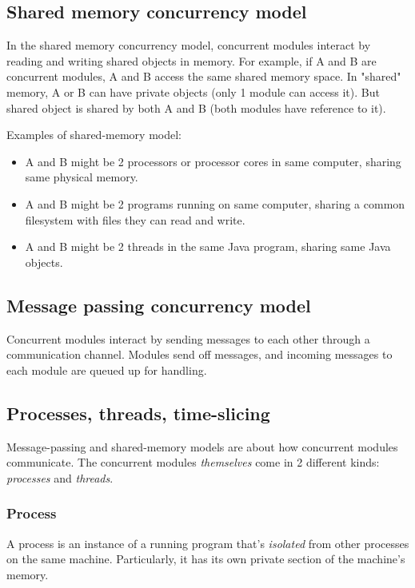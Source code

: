 \documentclass[10pt]{amsart}
\begin{document}
\begin{multicols*}{2}
\subsection{Shared memory concurrency model}

In the shared memory concurrency model, concurrent modules interact by reading and writing shared objects in memory. For example, if A and B are concurrent modules, A and B access the same shared memory space. In "shared" memory, A or B can have private objects (only 1 module can access it). But shared object is shared by both A and B (both modules have reference to it).

Examples of shared-memory model:
\begin{itemize}
	\item A and B might be 2 processors or processor cores in same computer, sharing same physical memory.
	\item A and B might be 2 programs running on same computer, sharing a common filesystem with files they can read and write.
	\item A and B might be 2 threads in the same Java program, sharing same Java objects.
\end{itemize}

\subsection{Message passing concurrency model}

Concurrent modules interact by sending messages to each other through a communication channel. Modules send off messages, and incoming messages to each module are queued up for handling.

\subsection{Processes, threads, time-slicing}

Message-passing and shared-memory models are about how concurrent modules communicate. The concurrent modules \emph{themselves} come in 2 different kinds: \emph{processes} and \emph{threads}. \\

\subsubsection{Process}

A process is an instance of a running program that's \emph{isolated} from other processes on the same machine. Particularly, it has its own private section of the machine's memory.


\end{multicols*}
\end{document}
